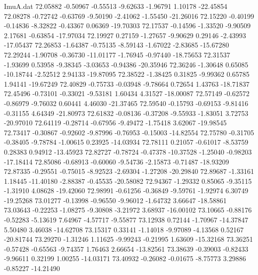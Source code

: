 \begin{filecontents}{ImuA.dat}
  72.05882   -0.50967   -0.55513   -9.62633   -1.96791    1.10178  -22.45854
  72.08278   -0.72742   -0.63769   -9.50190   -2.41062   -1.55450  -21.26016
  72.15220   -0.40199   -0.14836   -8.32822   -0.43367    0.06369  -19.70303
  72.17537   -0.14596   -1.33520   -9.90509    2.17681   -0.63854  -17.97034
  72.19927    0.27159   -1.27657   -9.90629    0.29146   -2.43993  -17.05437
  72.26853   -1.64387   -0.75135   -8.59143   -1.67022   -2.83685  -15.67280
  72.29244   -1.90708   -0.36730  -11.01177   -1.76945   -0.97440  -18.75653
  72.31537   -1.93699    0.53958   -9.38345   -3.03653   -0.94386  -20.35946
  72.36246   -1.30648    0.65085  -10.18744   -2.52512    2.94133  -19.87095
  72.38522   -1.38425    0.31825   -9.99362    0.65785    1.94141  -19.67249
  72.40829   -0.75733   -0.03948   -9.78664    0.72654    1.43763  -18.71837
  72.45496   -0.73101   -0.33021   -9.53181    1.60434    4.31527  -18.00087
  72.57149   -0.62572   -0.86979   -9.76032    0.60441    4.46030  -21.37465
  72.59540   -0.15793   -0.69153   -9.81416   -0.31155    4.64349  -21.80973
  72.61832   -0.08136   -0.37208   -9.55933   -1.83051    3.72753  -20.97010
  72.64119   -0.28714   -0.67956   -9.49472   -1.75418    3.62067  -19.98545
  72.73417   -0.30867   -0.92602   -9.87996   -0.76953   -0.15003  -14.82554
  72.75780   -0.31705   -0.38405   -9.78784   -1.00615    0.23925  -14.03934
  72.78111    0.21057   -0.61017   -8.53759    0.28383    0.94912  -13.45923
  72.82727   -0.78724   -0.47378  -10.37528   -1.25040   -0.98203  -17.18414
  72.85086   -0.68913   -0.60060   -9.54736   -2.15873   -0.71487  -18.93209
  72.87335   -0.29551   -0.75015   -8.92523   -2.69304   -1.27208  -20.29840
  72.89687   -1.33161    1.18445  -11.40180   -2.88387   -0.45535  -20.58082
  72.94367   -1.29332    0.85065   -9.35115   -1.31910    4.08628  -19.42060
  72.98991   -0.61256   -0.36849   -9.59761   -1.92974    6.30749  -19.25268
  73.01277   -0.13998   -0.96550   -9.96012   -1.64732    3.66647  -18.58861
  73.03643   -0.22253   -1.08275   -9.30808   -3.21972    3.68937  -16.00102
  73.10665   -0.88176   -0.52283   -5.13619    7.64967   -4.57717   -9.55877
  73.12938    0.72144   -1.70967  -14.37847    5.50480    3.46038  -14.62708
  73.15317    0.33141   -1.14018   -9.97089   -4.13568    0.52167  -20.81744
  73.29270   -1.31246    1.11625   -9.99243   -0.21995    1.63609  -15.32168
  73.36251   -0.57428   -0.65563   -9.74357    1.76463    2.66654  -13.82561
  73.38639   -0.39003   -0.82433   -9.96611    0.32199    1.00255  -14.03171
  73.40932   -0.26082   -0.01675   -8.75773    3.29886   -0.85227  -14.21490

\end{filecontents}
